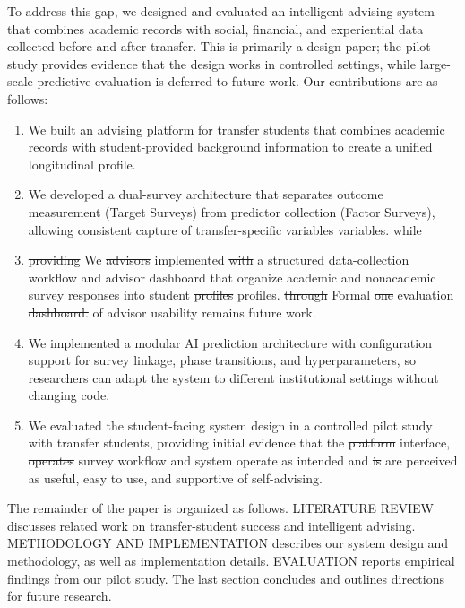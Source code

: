 \documentclass[letterpaper,11pt]{article}
\newcommand{\DIFdel}[1]{%
  \begingroup\setlength{\fboxsep}{0.5pt}%
  \colorbox{diffdelbg}{\textcolor{diffdeltext}{\sout{#1}}}%
  \endgroup}
\newcommand{\DIFadd}[1]{%
  \begingroup\setlength{\fboxsep}{0.5pt}%
  \colorbox{diffaddbg}{\textcolor{diffaddtext}{#1}}%
  \endgroup}
\begin{document}
To address this gap, we designed and evaluated an intelligent advising system that combines academic records with social, financial, and experiential data collected before and after transfer. This is primarily a design paper; the pilot study provides evidence that the design works in controlled settings, while large-scale predictive evaluation is deferred to future work. Our contributions are as follows:

\begin{enumerate}
    \item We built an advising platform for transfer students that combines academic records with student-provided background information to create a unified longitudinal profile.
    \item We developed a dual-survey architecture that separates outcome measurement (Target Surveys) from predictor collection (Factor Surveys), allowing consistent capture of transfer-specific \DIFdel{variables} \DIFadd{variables.}
    \DIFdel{while} \item \DIFdel{providing} \DIFadd{We} \DIFdel{advisors} \DIFadd{implemented} \DIFdel{with} \DIFadd{a} structured \DIFadd{data-collection} \DIFadd{workflow} \DIFadd{and} \DIFadd{advisor} \DIFadd{dashboard} \DIFadd{that} \DIFadd{organize} \DIFadd{academic} \DIFadd{and} \DIFadd{nonacademic} \DIFadd{survey} \DIFadd{responses} \DIFadd{into} student \DIFdel{profiles} \DIFadd{profiles.} \DIFdel{through} \DIFadd{Formal} \DIFdel{one} \DIFadd{evaluation} \DIFdel{dashboard.} \DIFadd{of} \DIFadd{advisor} \DIFadd{usability} \DIFadd{remains} \DIFadd{future} \DIFadd{work.}
    \item We implemented a modular \DIFadd{AI} prediction architecture with configuration support for survey linkage, phase transitions, and hyperparameters, so researchers can adapt the system to different institutional settings without changing code.
    \item We evaluated the \DIFadd{student-facing} system design in a controlled pilot study with transfer students, providing initial evidence that the \DIFdel{platform} \DIFadd{interface,} \DIFdel{operates} \DIFadd{survey} \DIFadd{workflow} \DIFadd{and} \DIFadd{system} \DIFadd{operate} as intended and \DIFdel{is} \DIFadd{are} perceived as useful, easy to use, and supportive of self-advising.
\end{enumerate}

The remainder of the paper is organized as follows. LITERATURE REVIEW discusses related work on transfer-student success and intelligent advising. METHODOLOGY AND IMPLEMENTATION describes our system design and methodology, as well as implementation details. EVALUATION reports empirical findings from our pilot study. The last section concludes and outlines directions for future research.
\end{document}
